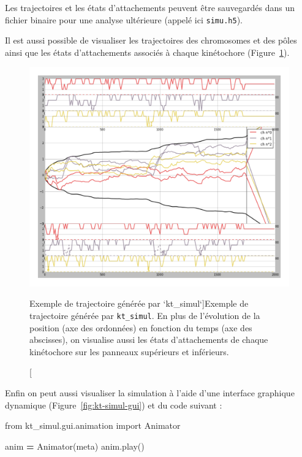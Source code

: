 \documentclass[12pt,a4paper,twoside,openright]{book}
\newenvironment{Shaded}{\begin{snugshade}}{\end{snugshade}}
\newcommand{\ImportTok}[1]{{#1}}
\newcommand{\OperatorTok}[1]{\textcolor[rgb]{0.81,0.36,0.00}{\textbf{{#1}}}}
\newcommand{\NormalTok}[1]{{#1}}
\begin{document}
Les trajectoires et les états d'attachements peuvent être sauvegardés
dans un fichier binaire pour une analyse ultérieure (appelé ici
\texttt{simu.h5}).

Il est aussi possible de visualiser les trajectoires des chromosomes et
des pôles ainsi que les états d'attachements associés à chaque
kinétochore (Figure~\ref{fig:kt-simul-traj}).

\begin{figure}[htbp]
\centering
\includegraphics{figures/annexes/trajectories.png}
\caption[Exemple de trajectoire générée par `kt\_simul`]{\label{fig:kt-simul-traj}Exemple
de trajectoire générée par \texttt{kt\_simul}. En plus de l'évolution de
la position (axe des ordonnées) en fonction du temps (axe des
abscisses), on visualise aussi les états d'attachements de chaque
kinétochore sur les panneaux supérieurs et inférieurs.}
\end{figure}

Enfin on peut aussi visualiser la simulation à l'aide d'une interface
graphique dynamique (Figure~\ref{fig:kt-simul-gui}) et du code suivant :

\begin{Shaded}
\begin{Highlighting}[]
\ImportTok{from} \NormalTok{kt_simul.gui.animation }\ImportTok{import} \NormalTok{Animator}

\NormalTok{anim }\OperatorTok{=} \NormalTok{Animator(meta)}
\NormalTok{anim.play()}
\end{Highlighting}
\end{Shaded}
\end{document}
